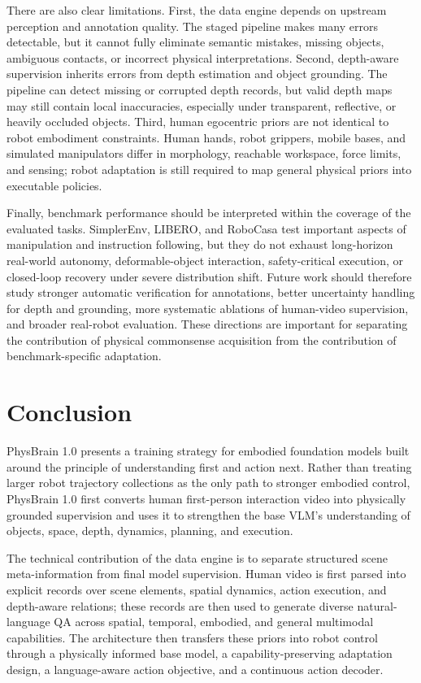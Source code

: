 \documentclass{llmxive}
\begin{document}
There are also clear limitations. First, the data engine depends on upstream perception and annotation quality. The staged pipeline makes many errors detectable, but it cannot fully eliminate semantic mistakes, missing objects, ambiguous contacts, or incorrect physical interpretations. Second, depth-aware supervision inherits errors from depth estimation and object grounding. The pipeline can detect missing or corrupted depth records, but valid depth maps may still contain local inaccuracies, especially under transparent, reflective, or heavily occluded objects. Third, human egocentric priors are not identical to robot embodiment constraints. Human hands, robot grippers, mobile bases, and simulated manipulators differ in morphology, reachable workspace, force limits, and sensing; robot adaptation is still required to map general physical priors into executable policies.

Finally, benchmark performance should be interpreted within the coverage of the evaluated tasks. SimplerEnv, LIBERO, and RoboCasa test important aspects of manipulation and instruction following, but they do not exhaust long-horizon real-world autonomy, deformable-object interaction, safety-critical execution, or closed-loop recovery under severe distribution shift. Future work should therefore study stronger automatic verification for annotations, better uncertainty handling for depth and grounding, more systematic ablations of human-video supervision, and broader real-robot evaluation. These directions are important for separating the contribution of physical commonsense acquisition from the contribution of benchmark-specific adaptation.

\section{Conclusion}
\label{sec:conclusion}

PhysBrain 1.0 presents a training strategy for embodied foundation models built around the principle of understanding first and action next. Rather than treating larger robot trajectory collections as the only path to stronger embodied control, PhysBrain 1.0 first converts human first-person interaction video into physically grounded supervision and uses it to strengthen the base VLM's understanding of objects, space, depth, dynamics, planning, and execution.

The technical contribution of the data engine is to separate structured scene meta-information from final model supervision. Human video is first parsed into explicit records over scene elements, spatial dynamics, action execution, and depth-aware relations; these records are then used to generate diverse natural-language QA across spatial, temporal, embodied, and general multimodal capabilities. The architecture then transfers these priors into robot control through a physically informed base model, a capability-preserving adaptation design, a language-aware action objective, and a continuous action decoder.
\end{document}
